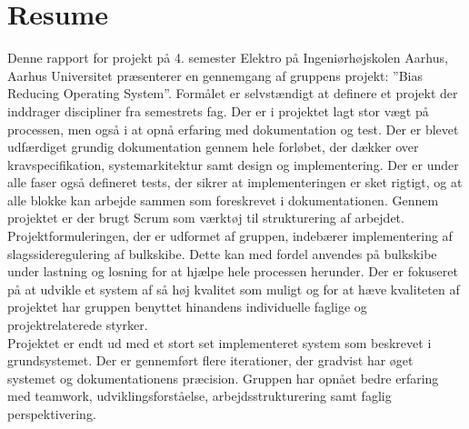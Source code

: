\chapter{Resume}
Denne rapport for projekt på 4. semester Elektro på Ingeniørhøjskolen Aarhus, Aarhus Universitet præsenterer en gennemgang af gruppens projekt: ”Bias Reducing Operating System”. Formålet er selvstændigt at definere et projekt der inddrager discipliner fra semestrets fag. 
Der er i projektet lagt stor vægt på processen, men også i at opnå erfaring med dokumentation og test. Der er blevet udfærdiget grundig dokumentation gennem hele forløbet, der dækker over kravspecifikation, systemarkitektur samt design og implementering. Der er under alle faser også defineret tests, der sikrer at implementeringen er sket rigtigt, og at alle blokke kan arbejde sammen som foreskrevet i dokumentationen. Gennem projektet er der brugt Scrum som værktøj til strukturering af arbejdet.\\

Projektformuleringen, der er udformet af gruppen, indebærer implementering af slagssideregulering af bulkskibe. Dette kan med fordel anvendes på bulkskibe under lastning og losning for at hjælpe hele processen herunder. Der er fokuseret på at udvikle et system af så høj kvalitet som muligt og for at hæve kvaliteten af projektet har gruppen benyttet hinandens individuelle faglige og projektrelaterede styrker.\\

Projektet er endt ud med et stort set implementeret system som beskrevet i grundsystemet. Der er gennemført flere iterationer, der gradvist har øget systemet og dokumentationens præcision. Gruppen har opnået bedre erfaring med teamwork, udviklingsforståelse, arbejdsstrukturering samt faglig perspektivering.


